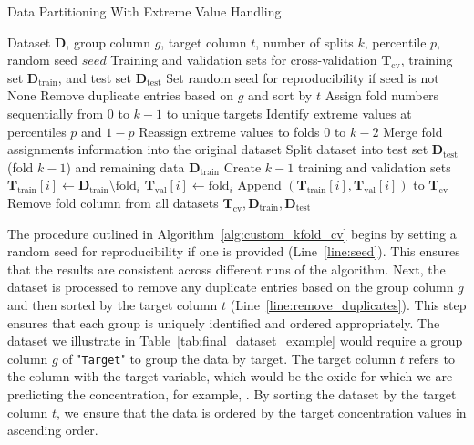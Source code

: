 \begin{algorithm}
\caption{Data Partitioning With Extreme Value Handling}
\label{alg:custom_kfold_cv}
\begin{algorithmic}[1]
\Require Dataset $\mathbf{D}$, group column $g$, target column $t$, number of splits $k$, percentile $p$, random seed $\textit{seed}$
\Ensure Training and validation sets for cross-validation $\mathbf{T}_\text{cv}$, training set $\mathbf{D}_\text{train}$, and test set $\mathbf{D}_\text{test}$
\State \label{line:seed} Set random seed for reproducibility if $\text{seed}$ is not None
\State \label{line:remove_duplicates} Remove duplicate entries based on $g$ and sort by $t$
\State \label{line:assign_folds} Assign fold numbers sequentially from 0 to $k-1$ to unique targets
    \State \label{line:identify_extremes} Identify extreme values at percentiles $p$ and $1-p$
    \State \label{line:reassign_extremes} Reassign extreme values to folds $0$ to $k-2$
\EndIf
\State \label{line:merge_folds} Merge fold assignments information into the original dataset
\State \label{line:split_dataset} Split dataset into test set $\mathbf{D}_\text{test}$ (fold $k-1$) and remaining data $\mathbf{D}_\text{train}$
\State \label{line:create_folds} Create $k-1$ training and validation sets
    \State $\mathbf{T}_\text{train}[i] \gets \mathbf{D}_\text{train} \setminus \text{fold}_i$
    \State $\mathbf{T}_\text{val}[i] \gets \text{fold}_i$
    \State Append $(\mathbf{T}_\text{train}[i], \mathbf{T}_\text{val}[i])$ to $\mathbf{T}_\text{cv}$
\EndFor
\State \label{line:remove_fold_column} Remove fold column from all datasets
\State \Return $\mathbf{T}_\text{cv}, \mathbf{D}_\text{train}, \mathbf{D}_\text{test}$
\end{algorithmic}
\end{algorithm}

The procedure outlined in Algorithm~\ref{alg:custom_kfold_cv} begins by setting a random seed for reproducibility if one is provided (Line~\ref{line:seed}).
This ensures that the results are consistent across different runs of the algorithm.
Next, the dataset is processed to remove any duplicate entries based on the group column $g$ and then sorted by the target column $t$ (Line~\ref{line:remove_duplicates}).
This step ensures that each group is uniquely identified and ordered appropriately.
The dataset we illustrate in Table~\ref{tab:final_dataset_example} would require a group column $g$ of "\texttt{Target}" to group the data by target.
The target column $t$ refers to the column with the target variable, which would be the oxide for which we are predicting the concentration, for example, .
By sorting the dataset by the target column $t$, we ensure that the data is ordered by the target concentration values in ascending order.

